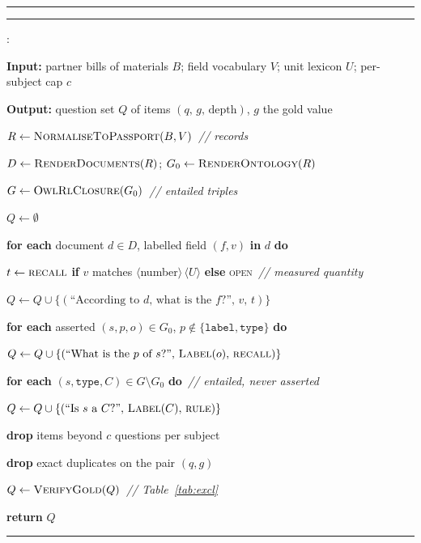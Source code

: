 \documentclass[conference]{IEEEtran}
\newcounter{algline}
\newenvironment{pseudo}
  {\setcounter{algline}{0}\footnotesize
   \begin{list}{\scriptsize\arabic{algline}:}%
     {\usecounter{algline}%
      \setlength{\leftmargin}{1.7em}\setlength{\labelwidth}{1.2em}%
      \setlength{\labelsep}{0.5em}\setlength{\itemsep}{1pt}%
      \setlength{\parsep}{0pt}\setlength{\topsep}{3pt}%
      \setlength{\partopsep}{0pt}\raggedright}}
  {\end{list}}
\newcommand{\kw}[1]{\textbf{#1}}          %
\newcommand{\pr}[1]{\textsc{#1}}          %
\newcommand{\IND}{\hspace*{1.2em}}        %
\newcommand{\cmt}[1]{{\itshape\,// #1}}   %
\begin{document}
\vspace{9pt}
\hrule
\vspace{-7pt}
\begin{algorithm}[h]
\vspace{3pt}
\hrule
\vspace{1pt}
\normalcolor  %
\caption{\color{black}Automated question generation with verified gold answers.
}
\label{alg:gen}
\begin{pseudo}
\vspace{5pt}
\item[] \kw{Input:} partner bills of materials $B$; field vocabulary $V$;
        unit lexicon $U$; per-subject cap $c$
\item[] \kw{Output:} question set $Q$ of items $(q,\,g,\,\text{depth})$,
        $g$ the gold value
\item $R \gets \pr{NormaliseToPassport}(B,V)$ \cmt{records~\cite{esfarealam2025synthdpp}}
\item $D \gets \pr{RenderDocuments}(R)$;\; $G_0 \gets \pr{RenderOntology}(R)$
\item $G \gets \pr{OwlRlClosure}(G_0)$ \cmt{entailed triples~\cite{owlrl2012}}
\item $Q \gets \emptyset$
\item \kw{for each} document $d\in D$, labelled field $(f,v)$ \kw{in} $d$ \kw{do}
\item[] \IND $t \gets \textsc{recall}$ \kw{if} $v$ matches
        $\langle$number$\rangle\,\langle U\rangle$ \kw{else} \textsc{open}
        \cmt{measured quantity}
\item[] \IND $Q \gets Q \cup \{(\text{``According to }d\text{, what is the
        }f\text{?''},\, v,\, t)\}$
\item \kw{for each} asserted $(s,p,o)\in G_0$, $p\notin\{\texttt{label},
      \texttt{type}\}$ \kw{do}
\item[] \IND $Q \gets Q \cup \{(\text{``What is the }p\text{ of }s\text{?''},\,
        \pr{Label}(o),\, \textsc{recall})\}$
\item \kw{for each} $(s,\texttt{type},C)\in G\setminus G_0$ \kw{do}
      \cmt{entailed, never asserted}
\item[] \IND $Q \gets Q \cup \{(\text{``Is }s\text{ a }C\text{?''},\,
        \pr{Label}(C),\, \textsc{rule})\}$
\item \kw{drop} items beyond $c$ questions per subject
\item \kw{drop} exact duplicates on the pair $(q,g)$
\item $Q \gets \pr{VerifyGold}(Q)$ \cmt{Table~\ref{tab:excl}}
\item \kw{return} $Q$
\end{pseudo}
\vspace{1pt}
\hrule
\end{algorithm}
\end{document}
